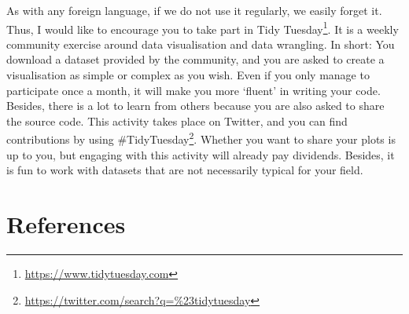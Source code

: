 \documentclass[
  letterpaper,
]{krantz}
\renewcommand{\href}[2]{#2\footnote{\url{#1}}}
\begin{document}
As with any foreign language, if we do not use it regularly, we easily
forget it. Thus, I would like to encourage you to take part in
\href{https://www.tidytuesday.com}{Tidy Tuesday}. It is a weekly
community exercise around data visualisation and data wrangling. In
short: You download a dataset provided by the community, and you are
asked to create a visualisation as simple or complex as you wish. Even
if you only manage to participate once a month, it will make you more
`fluent' in writing your code. Besides, there is a lot to learn from
others because you are also asked to share the source code. This
activity takes place on Twitter, and you can find contributions by using
\href{https://twitter.com/search?q=\%23tidytuesday}{\#TidyTuesday}.
Whether you want to share your plots is up to you, but engaging with
this activity will already pay dividends. Besides, it is fun to work
with datasets that are not necessarily typical for your field.


\chapter*{References}\label{references}

\end{document}
